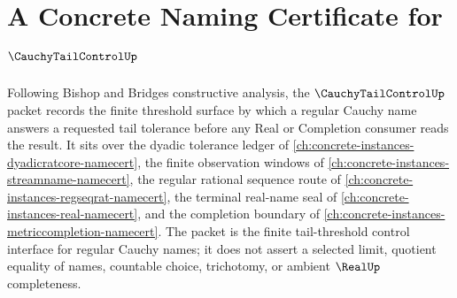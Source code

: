 \chapter{A Concrete Naming Certificate for $\CauchyTailControlUp$}
\label{ch:concrete-instances-cauchy-tail-control-namecert}

Following Bishop and Bridges constructive analysis, the $\CauchyTailControlUp$ packet records the finite threshold surface by which a regular Cauchy name answers a requested tail tolerance before any Real or Completion consumer reads the result. It sits over the dyadic tolerance ledger of \autoref{ch:concrete-instances-dyadicratcore-namecert}, the finite observation windows of \autoref{ch:concrete-instances-streamname-namecert}, the regular rational sequence route of \autoref{ch:concrete-instances-regseqrat-namecert}, the terminal real-name seal of \autoref{ch:concrete-instances-real-namecert}, and the completion boundary of \autoref{ch:concrete-instances-metriccompletion-namecert}. The packet is the finite tail-threshold control interface for regular Cauchy names; it does not assert a selected limit, quotient equality of names, countable choice, trichotomy, or ambient $\RealUp$ completeness.

